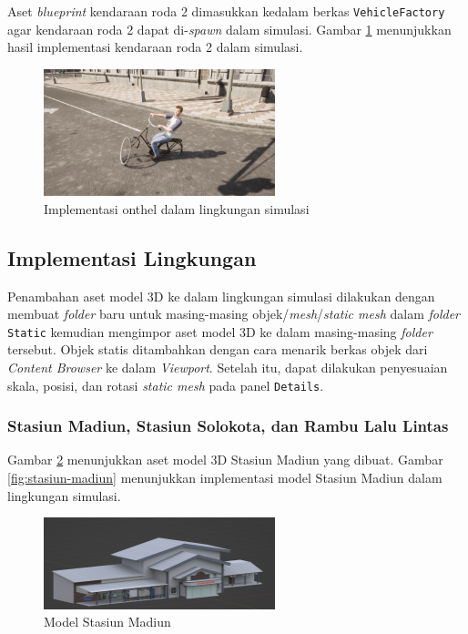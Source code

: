 Aset \textit{blueprint} kendaraan roda 2 dimasukkan kedalam berkas
\verb|VehicleFactory| agar kendaraan roda 2 dapat di-\textit{spawn} dalam
simulasi. Gambar \ref{fig:onthel-carla} menunjukkan hasil implementasi kendaraan
roda 2 dalam simulasi.

\begin{figure}[!h]
    \centering
    \includegraphics[width=0.6\textwidth]{resources/chapter-4/onthel-carla.png}
    \caption{Implementasi onthel dalam lingkungan simulasi}
    \label{fig:onthel-carla}
\end{figure}

\subsection{Implementasi Lingkungan}

Penambahan aset model 3D ke dalam lingkungan simulasi dilakukan dengan membuat
\textit{folder} baru untuk masing-masing objek/\textit{mesh}/\textit{static
mesh} dalam \textit{folder} \verb|Static| kemudian mengimpor aset model 3D ke
dalam masing-masing \textit{folder} tersebut. Objek statis ditambahkan dengan
cara menarik berkas objek dari \textit{Content Browser} ke dalam
\textit{Viewport}. Setelah itu, dapat dilakukan penyesuaian skala, posisi, dan
rotasi \textit{static mesh} pada panel \verb|Details|.

\subsubsection{Stasiun Madiun, Stasiun Solokota, dan Rambu Lalu Lintas}

Gambar \ref{fig:stasiun-madiun-model} menunjukkan aset model 3D Stasiun Madiun
yang dibuat. Gambar \ref{fig:stasiun-madiun} menunjukkan implementasi model
Stasiun Madiun dalam lingkungan simulasi.

\begin{figure}[!h]
    \centering
    \includegraphics[width=0.6\textwidth]{resources/chapter-3-stasiun-madiun-model.png}
    \caption{Model Stasiun Madiun}
    \label{fig:stasiun-madiun-model}
\end{figure}

